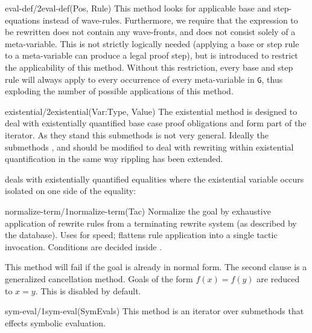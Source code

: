 \begin{method}{eval-def/2}{eval-def(Pos, Rule)}%
{\tiny
}
This method looks for applicable base and step-equations
instead of wave-rules. Furthermore, we require that the expression 
to be rewritten does not contain any wave-fronts, and does not consist 
solely of a meta-variable. This is not strictly logically needed (applying 
a base or step rule to a meta-variable can produce a legal proof step), but is
introduced to restrict the applicability of this method. Without this
restriction, every base and step rule will always apply to every occurrence of
every meta-variable in {\tt G}, thus exploding the number of possible
applications of this method.
\end{method}

\begin{method}{existential/2}{existential(Var:Type, Value)}%
The existential method is designed to deal with existentially
quantified base case proof obligations and form part of the
 iterator. \notnice As they stand this submethods is not
very general. Ideally the submethods ,  and
 should be modified to deal with rewriting within
existential quantification in the same way rippling has been extended.

 deals with existentially
quantified equalities where the existential variable occurs
isolated on one side of the equality:
{\tiny
}
\end{method}

\begin{method}{normalize-term/1}{normalize-term(Tac)}%
Normalize the goal by exhaustive application of
rewrite rules from a terminating rewrite system (as described by the
 database).  Uses  for
speed; flattens rule application into a single tactic invocation.
Conditions are decided inside .
   
This method will fail if the goal is already in normal form. 
{\tiny
}
The second clause is a generalized cancellation method.  Goals of the
form $f(x)=f(y)$ are reduced to $x=y$.  This is disabled by default.
\end{method}


\begin{method}{sym-eval/1}{sym-eval(SymEvals)}%
This method is an iterator over submethods that effects symbolic
evaluation.   
{\tiny
}
\end{method}

